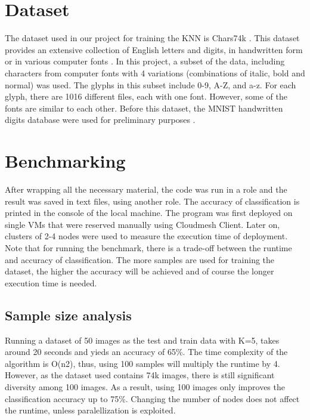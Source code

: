 \documentclass[9pt,twocolumn,twoside]{../../styles/osajnl}
\begin{document}
\section{Dataset}
The dataset used in our project for training the KNN is Chars74k \cite{chars74k-dataset}.
This dataset provides an extensive collection of English letters and digits, 
in handwritten form or in various computer fonts \cite{de2009character}. In this project, a subset 
of the data, including characters from computer fonts with 4 variations (combinations
of italic, bold and normal) was used. The glyphs in this subset include 0-9, A-Z, and a-z.
For each glyph, there are 1016 different files, each with one font. However, some of the fonts
are similar to each other.
\newline
Before this dataset, the MNIST handwritten digits database were used for preliminary 
purposes \cite{mnist-dataset}.

\section{Benchmarking}

After wrapping all the necessary material, the code was run in a role and the result
was saved in text files, using another role. The accuracy of classification is printed
in the console of the local machine.
The program was first deployed on single VMs that were reserved manually using 
Cloudmesh Client. Later on, clusters of 2-4 nodes were used to measure the execution
time of deployment. Note that for running the benchmark, there is a trade-off between the runtime
and accuracy of classification. The more samples are used for training the dataset, the higher the
accuracy will be achieved and of course the longer execution time is needed. 

\subsection{Sample size analysis}

Running a dataset of 50 images as the test and train data
with K=5, takes around 20 seconds and yieds an accuracy of 65\%. The time complexity
of the algorithm is O(n2), thus, using 100 samples will multiply the runtime by 4. 
However, as the dataset used contains 74k images, there is still significant diversity
among 100 images. As a result, using 100 images only improves the classification 
accuracy up to 75\%. Changing the number of nodes does not affect the runtime, unless paralellization
is exploited.
\end{document}
